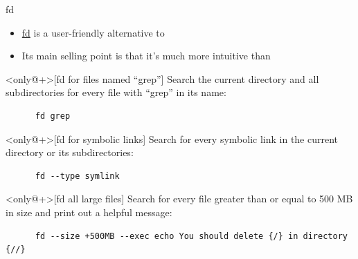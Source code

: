 \begin{frame}[fragile]{fd}
  \begin{itemize}
    \item \href{https://github.com/sharkdp/fd}{fd} is a user-friendly
      alternative to 
    \item Its main selling point is that it's much more intuitive than 
  \end{itemize}
  \pause
  \vfill
  \begin{example}<only@+>[fd for files named \enquote{grep}]
    Search the current directory and all subdirectories for every file with
    \enquote{grep} in its name:
    \begin{verbatim}
      fd grep
    \end{verbatim}
  \end{example}
  \begin{example}<only@+>[fd for symbolic links]
    Search for every symbolic link in the current directory or its subdirectories:
    \begin{verbatim}
      fd --type symlink
    \end{verbatim}
  \end{example}
  \begin{example}<only@+>[fd all large files]
    Search for every file greater than or equal to 500 MB in size and print out
    a helpful message:
    \begin{verbatim}
      fd --size +500MB --exec echo You should delete {/} in directory {//}
    \end{verbatim}
  \end{example}
\end{frame}

